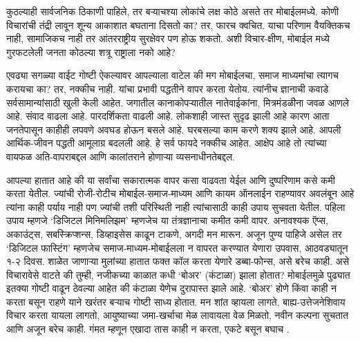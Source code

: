कुठल्याही सार्वजनिक ठिकाणी पाहिले, तर बऱ्याचश्या लोकांचे लक्ष कोठे असते तर मोबाईलमध्ये. कोणी विचारांची तंद्री लावून शून्य आकाशात बघताना दिसतो का? तर, फारच क्वचित. याचा परिणाम वैयक्तिकच नाही, सामाजिकच नाही तर आंतरराष्ट्रीय सुरक्षेवर पण होऊ शकतो. अशी विचार-क्षीण, मोबाईल मध्ये गुरफटलेली जनता कोठल्या शत्रू राष्ट्राला नको आहे?

एवढ्या सगळ्या वाईट गोष्टी ऐकल्यावर आपल्याला वाटेल की मग मोबाईलचा, समाज माध्यमांचा त्यागच करायचा का? तर, नक्कीच नाही. यांचा प्रभावी पद्धतीने वापर करता येतोय. त्यांनीच ज्ञानाची कवाडे सर्वसामान्यांसाठी खुली केली आहेत. जगातील कानाकोपऱ्यातील  नातेवाईकांना, मित्रमंडळीना जवळ आणले आहे. संवाद वाढला आहे. पारदर्शिकता वाढली आहे. लोकशाही जास्त सुदृढ झाली आहे कारण आता जनतेपासून काहीही लपवणे अवघड होऊन बसले आहे. घरबसल्या काम करणे शक्य झाले आहे. आपली आर्थिक-जीवन पद्धती आमूलाग्र बदलली आहे. हे सर्व फायदे नक्कीच आहेत. आक्षेप आहे तो त्यांच्या वायफळ अति-वापराबद्दल आणि कालांतराने होणाऱ्या व्यसनाधीनतेबद्दल.

आपल्या हातात आहे की या सर्वांचा सकारात्मक वापर कसा वाढवता येईल आणि दुष्परिणाम कसे कमी करता येतील. ज्यांची रोजी-रोटीच मोबाईल-समाज-माध्यम आणि कायम ऑनलाईन राहण्यावर अवलंबून आहे त्यांना काही पर्याय नाही पण ज्यांची तशी परिस्थिती नाही त्यांचासाठी काही उपाय सुचवता येतील. पहिला उपाय म्हणजे `डिजिटल मिनिमलिझम' म्हणजेच या तंत्रज्ञानाचा कमीत कमी वापर. अनावश्यक ऍप्स, अकाउंट्स, सबस्क्रिप्शन्स, डिव्हाइसेस काढून टाकणे, अगदी मन मारून. अजून पुण्य पाहिजे असेल तर `डिजिटल फास्टिंग' म्हणजेच समाज-माध्यम-मोबाईलला न वापरत करण्यात येणारा उपवास, आठवड्यातून १-२ दिवस. शाळेत जाणाऱ्या मुलांच्या हातात फक्त कॉल करता येणारे डब्बा-फोन्स, असे बरेच काही. असे विचारावेसे वाटते की तुम्ही, नजीकच्या काळात कधी `बोअर' (कंटाळा) झाला होतात? मोबाईलमुळे पुढ्यात इतक्या गोष्टी वाढून ठेवल्या आहेत की कंटाळा येणेच दुरापास्त झाले आहे. `बोअर' होणे किंवा काही न करता बसून राहणे याने खरंतर बऱ्याच गोष्टी साध्य होतात. मन शांत व्हायला लागते, बाह्य-उत्तेजनेशिवाय विचार करता यायला लागतो, आयुष्याच्या जमा-खर्चाचा मेळ लावायला वेळ मिळतो, नवीन कल्पना सुचतात आणि अजून बरेच काही. गंमत म्हणून एखादा तास काही न करता, एकटे बसून बघाच .